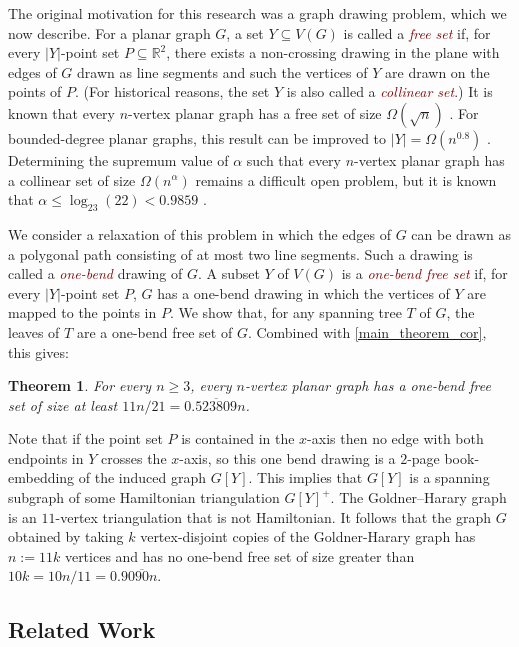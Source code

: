 \documentclass{article}
\newcommand{\R}{\mathbb{R}}
\newtheorem{thm}{Theorem}
\newcommand{\defin}[1]{\emph{\textcolor{Maroon}{#1}}}
\theoremstyle{definition}
\begin{document}
The original motivation for this research was a graph drawing problem, which we now describe.  For a planar graph $G$, a set $Y\subseteq V(G)$ is called a \defin{free set} if, for every $|Y|$-point set $P\subseteq\R^2$, there exists a non-crossing drawing in the plane with edges of $G$ drawn as line segments and such the vertices of $Y$ are drawn on the points of $P$.  (For historical reasons, the set $Y$ is also called a \defin{collinear set}.)  It is known that every $n$-vertex planar graph has a free set of size $\Omega(\sqrt{n})$ \cite{bose.dujmovic:polynomial,dujmovic:utility,dujmovic.frati.ea:every}.
For bounded-degree planar graphs, this result can be improved to $|Y|=\Omega(n^{0.8})$ \cite{dujmovic.morin:dual}.  Determining the supremum value of $\alpha$ such that every $n$-vertex planar graph has a collinear set of size $\Omega(n^{\alpha})$ remains a difficult open problem, but it is known that $\alpha \le \log_{23}(22)<0.9859$ \cite{ravsky.verbitsky:collinear}.

We consider a relaxation of this problem in which the edges of $G$ can be drawn as a polygonal path consisting of at most two line segments.  Such a drawing is called a \defin{one-bend} drawing of $G$. A subset $Y$ of $V(G)$ is a \defin{one-bend free set} if, for every $|Y|$-point set $P$,  $G$ has a one-bend drawing in which the vertices of $Y$ are mapped to the points in $P$.  We show that, for any spanning tree $T$ of $G$, the leaves of $T$ are a one-bend free set of $G$.  Combined with \cref{main_theorem_cor}, this gives:

\begin{thm}\label{one_bend_collinear_thm}
  For every $n\ge 3$, every $n$-vertex planar graph has a one-bend free set of size at least $11n/21=0.\overline{523809}n$.
\end{thm}

Note that if the point set $P$ is contained in the $x$-axis then no edge with both endpoints in $Y$ crosses the $x$-axis, so this one bend drawing is a $2$-page book-embedding of the induced graph $G[Y]$. This implies that $G[Y]$ is a spanning subgraph of some Hamiltonian triangulation $G[Y]^+$.  The Goldner–Harary graph is an $11$-vertex triangulation that is not Hamiltonian. It follows that the graph $G$ obtained by taking $k$ vertex-disjoint copies of the Goldner-Harary graph has $n:=11k$ vertices and has no one-bend free set of size greater than $10k=10n/11=0.90\overline{90}n$.

\subsection{Related Work}
\end{document}
